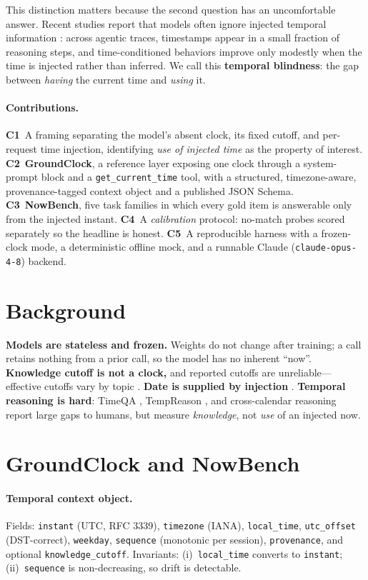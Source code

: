 \documentclass[11pt]{article}
\begin{document}
This distinction matters because the second question has an uncomfortable answer. Recent studies
report that models often ignore injected temporal information \cite{span2025,blindness2025}: across
agentic traces, timestamps appear in a small fraction of reasoning steps, and time-conditioned
behaviors improve only modestly when the time is injected rather than inferred. We call this
\textbf{temporal blindness}: the gap between \emph{having} the current time and \emph{using} it.

\paragraph{Contributions.}
\textbf{C1}~A framing separating the model's absent clock, its fixed cutoff, and per-request time
injection, identifying \emph{use of injected time} as the property of interest.
\textbf{C2}~\textbf{GroundClock}, a reference layer exposing one clock through a system-prompt block
and a \texttt{get\_current\_time} tool, with a structured, timezone-aware, provenance-tagged context
object and a published JSON Schema.
\textbf{C3}~\textbf{NowBench}, five task families in which every gold item is answerable only from
the injected instant.
\textbf{C4}~A \emph{calibration} protocol: no-match probes scored separately so the headline is
honest.
\textbf{C5}~A reproducible harness with a frozen-clock mode, a deterministic offline mock, and a
runnable Claude (\texttt{claude-opus-4-8}) backend.

\section{Background}
\textbf{Models are stateless and frozen.} Weights do not change after training; a call retains
nothing from a prior call, so the model has no inherent ``now''. \textbf{Knowledge cutoff is not a
clock,} and reported cutoffs are unreliable---effective cutoffs vary by topic
\cite{cheng2024dated,shah2025cutoff}. \textbf{Date is supplied by injection} \cite{anthropic_sysprompt,gpt55leak}.
\textbf{Temporal reasoning is hard}: TimeQA \cite{chen2021timeqa}, TempReason
\cite{tan2023tempreason}, and cross-calendar reasoning
\cite{span2025} report large gaps to humans, but measure \emph{knowledge}, not \emph{use} of an
injected now.

\section{GroundClock and NowBench}
\paragraph{Temporal context object.} Fields: \texttt{instant} (UTC, RFC 3339), \texttt{timezone}
(IANA), \texttt{local\_time}, \texttt{utc\_offset} (DST-correct), \texttt{weekday}, \texttt{sequence}
(monotonic per session), \texttt{provenance}, and optional \texttt{knowledge\_cutoff}. Invariants:
(i)~\texttt{local\_time} converts to \texttt{instant}; (ii)~\texttt{sequence} is non-decreasing, so
drift is detectable.
\end{document}

